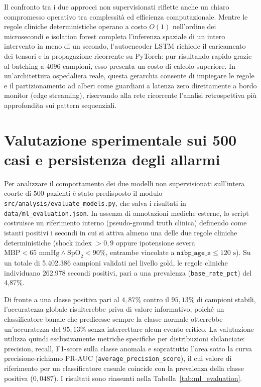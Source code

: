 Il confronto tra i due approcci non supervisionati riflette anche un chiaro compromesso operativo tra complessit\`a ed efficienza computazionale. Mentre le regole cliniche deterministiche operano a costo $O(1)$ nell'ordine dei microsecondi e isolation forest completa l'inferenza spaziale di un intero intervento in meno di un secondo, l'autoencoder LSTM richiede il caricamento dei tensori e la propagazione ricorrente su PyTorch: pur risultando rapido grazie al batching a $4096$ campioni, esso presenta un costo di calcolo superiore. In un'architettura ospedaliera reale, questa gerarchia consente di impiegare le regole e il partizionamento ad alberi come guardiani a latenza zero direttamente a bordo monitor (edge streaming), riservando alla rete ricorrente l'analisi retrospettiva pi\`u approfondita sui pattern sequenziali.

\section{Valutazione sperimentale sui 500 casi e persistenza degli allarmi}
Per analizzare il comportamento dei due modelli non supervisionati sull'intera coorte di $500$ pazienti \`e stato predisposto il modulo \texttt{src/analysis/evaluate\_models.py}, che salva i risultati in \texttt{data/ml\_evaluation.json}. In assenza di annotazioni mediche esterne, lo script costruisce un riferimento interno (pseudo-ground truth clinica) definendo come istanti positivi i secondi in cui si attiva almeno una delle due regole cliniche deterministiche (shock index $> 0,9$ oppure ipotensione severa $\text{MBP} < 65\text{ mmHg} \land \text{SpO}_2 < 90\%$, entrambe vincolate a $\texttt{nibp\_age\_s} \le 120\text{ s}$). Su un totale di 5.402.386 campioni validati nel livello gold, le regole cliniche individuano 262.978 secondi positivi, pari a una prevalenza (\texttt{base\_rate\_pct}) del 4,87\%.

Di fronte a una classe positiva pari al $4,87\%$ contro il $95,13\%$ di campioni stabili, l'accuratezza globale risulterebbe priva di valore informativo, poich\'e un classificatore banale che predicesse sempre la classe normale otterrebbe un'accuratezza del $95,13\%$ senza intercettare alcun evento critico. La valutazione utilizza quindi esclusivamente metriche specifiche per distribuzioni sbilanciate: precision, recall, F1-score sulla classe anomala e soprattutto l'area sotto la curva precisione-richiamo PR-AUC (\texttt{average\_precision\_score}), il cui valore di riferimento per un classificatore casuale coincide con la prevalenza della classe positiva ($0,0487$). I risultati sono riassunti nella Tabella~\ref{tab:ml_evaluation}.

